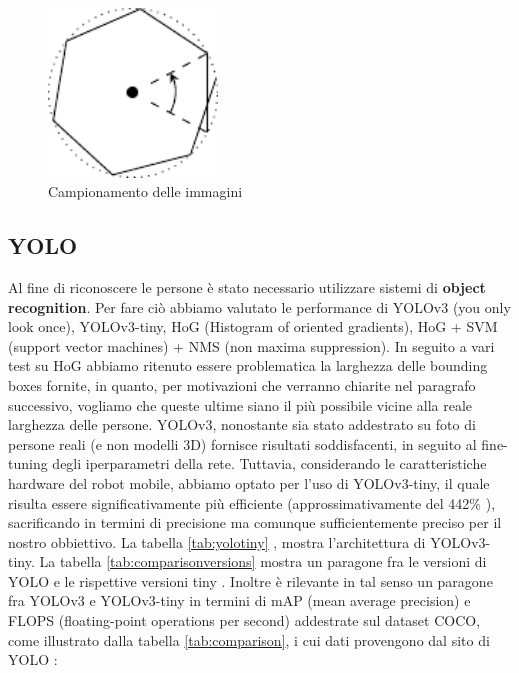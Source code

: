 \documentclass[a4paper]{article}
\begin{document}
	
	\begin{figure}[H]
		\centering
		\includegraphics[width=0.4\textwidth]{./img/pictures_sampling.pdf}
		\caption{Campionamento delle immagini}
		\label{fig:campionamento_immagini}
	\end{figure}
	
	\subsection{YOLO}\label{subsec:YOLO}
	Al fine di riconoscere le persone è stato necessario utilizzare sistemi di
	\textbf{object recognition}. Per fare ciò abbiamo valutato le performance di
	YOLOv3 (you only look once), YOLOv3-tiny, HoG (Histogram of oriented
	gradients), HoG + SVM (support vector machines) + NMS (non maxima
	suppression).  In seguito a vari test su HoG abbiamo ritenuto essere
	problematica la larghezza delle bounding boxes fornite, in quanto, per
	motivazioni che verranno chiarite nel paragrafo successivo, vogliamo che
	queste ultime siano il più possibile vicine alla reale larghezza delle
	persone. YOLOv3, nonostante sia stato addestrato su foto di persone reali
	(e non modelli 3D) fornisce risultati soddisfacenti, in seguito al
	fine-tuning degli iperparametri della rete. Tuttavia, considerando le
	caratteristiche hardware del robot mobile, abbiamo optato per l'uso di
	YOLOv3-tiny, il quale risulta essere significativamente più efficiente
	(approssimativamente del 442\% \cite{tiny_yolo}), sacrificando in termini
	di precisione ma comunque sufficientemente preciso per il nostro
	obbiettivo. La tabella \ref{tab:yolotiny} \cite{He2019TFYOLOAI}, mostra
	l'architettura di YOLOv3-tiny. La tabella \ref{tab:comparisonversions}
	mostra un paragone fra le versioni di YOLO e le rispettive versioni tiny
	\cite{tiny_yolo}. Inoltre è rilevante in tal senso un paragone fra YOLOv3 e
	YOLOv3-tiny in termini di mAP (mean average precision) e FLOPS
	(floating-point operations per second) addestrate sul dataset COCO, come
	illustrato dalla tabella \ref{tab:comparison}, i cui dati provengono dal
	sito di YOLO \cite{yolo}:
	
\end{document}
